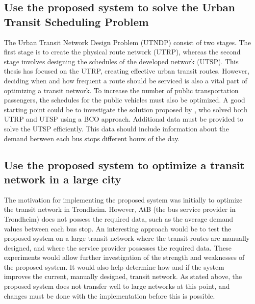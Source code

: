 \subsection*{Use the proposed system to solve the Urban Transit Scheduling Problem}
The Urban Transit Network Design Problem (UTNDP) consist of two stages. The first stage is to create the physical route network (UTRP), whereas the second stage involves designing the schedules of the developed network (UTSP). This thesis has focused on the UTRP, creating effective urban transit routes. However, deciding when and how frequent a route should be serviced is also a vital part of optimizing a transit network. To increase the number of public transportation passengers, the schedules for the public vehicles must also be optimized. A good starting point could be to investigate the solution proposed by \citet{nikolic14}, who solved both UTRP and UTSP using a BCO approach. Additional data must be provided to solve the UTSP efficiently. This data should include information about the demand between each bus stops different hours of the day.  

\subsection*{Use the proposed system to optimize a transit network in a large city}
The motivation for implementing the proposed system was initially to optimize the transit network in Trondheim. However, AtB (the bus service provider in Trondheim) does not possess the required data, such as the average demand values between each bus stop. An interesting approach would be to test the proposed system on a large transit network where the transit routes are manually designed, and where the service provider possesses the required data. These experiments would allow further investigation of the strength and weaknesses of the proposed system. It would also help determine how and if the system improves the current, manually designed, transit network. As stated above, the proposed system does not transfer well to large networks at this point, and changes must be done with the implementation before this is possible. 



